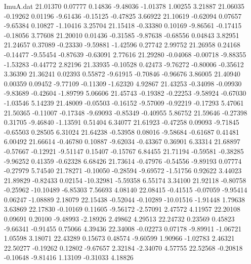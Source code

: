 \begin{filecontents}{ImuA.dat}
  21.01370    0.07777    0.14836   -9.48036   -1.01378    1.00255    3.21887
  21.06035   -0.19262    0.01196   -9.61436   -0.15125   -0.47825    3.66922
  21.10619   -0.62094    0.07657   -9.65384    0.10827   -1.10416    3.25704
  21.15418   -0.33380    0.10169   -9.86561   -0.17415   -0.18056    3.77608
  21.20010    0.01436   -0.31585   -9.87638   -0.68556    0.04843    3.82951
  21.24657    0.37089   -0.23330   -9.59881   -1.42596    0.27742    2.99752
  21.26958    0.24168   -0.14477   -9.55454   -0.87639   -0.63091    2.77616
  21.29280   -0.04068   -0.00718   -9.88355   -1.53283   -0.44772    2.82196
  21.33935   -0.10528    0.42473   -9.76272   -0.80006   -0.35612    3.36390
  21.36241    0.02393    0.55872   -9.61915   -0.70846   -0.96676    3.86005
  21.40940    0.00359    0.09452   -9.77109   -0.11309   -1.62320    4.92867
  21.43253   -0.34098   -0.09930   -9.83689   -0.42604   -1.89799    5.06606
  21.45743   -0.19382   -0.22253   -9.58924   -0.67030   -1.03546    5.14239
  21.48009   -0.05503   -0.16152   -9.57009   -0.92219   -0.17293    5.47061
  21.50365   -0.11007   -0.17348   -9.69093   -0.85349   -0.40955    5.86752
  21.59646   -0.27398    0.31705   -9.46840   -1.13591    0.51404    6.34077
  21.61923   -0.47258    0.09093   -9.71845   -0.65503    0.28505    6.31024
  21.64238   -0.53958    0.08016   -9.58684   -0.61687    0.41481    6.00492
  21.66614   -0.46780    0.10887   -9.62034   -0.43367    0.36901    6.33314
  21.68897   -0.57667   -0.12921   -9.51147    0.15407   -0.15767    6.84455
  21.71194   -0.59581   -0.38285   -9.96252    0.41359   -0.62328    6.68426
  21.73614   -0.47976   -0.54556   -9.89193    0.07774   -0.27979    5.74540
  21.78271   -0.10050   -0.28594   -9.69572   -1.51756    0.92622    3.44023
  21.89829   -0.82433    0.02154  -10.32981   -5.59358    6.55174    3.34100
  21.92118   -0.80758   -0.25962  -10.10489   -6.85303    7.56693    4.08140
  22.08415   -0.41515   -0.07059   -9.95414    0.06247   -1.08889    2.18079
  22.15438   -0.52044   -0.10289  -10.01516   -1.91448    1.79638    3.63869
  22.17830   -0.10169    0.11605   -9.56172   -2.57091    2.47572    4.11957
  22.20108    0.09691    0.20100   -9.48993   -2.18926    2.49862    4.29513
  22.24732    0.23569    0.45823   -9.66341   -0.91455    0.75066    4.39436
  22.34008   -0.02273    0.07178   -9.89911   -1.06721    1.05598    3.18071
  22.43289    0.15673    0.48574   -9.60599    1.90966   -1.02783    2.46321
  22.50277   -0.19262    0.12802   -9.67657    2.32184   -2.34070    4.57755
  22.52568   -0.20818   -0.10648   -9.81416    1.13109   -0.31033    4.18826

\end{filecontents}
